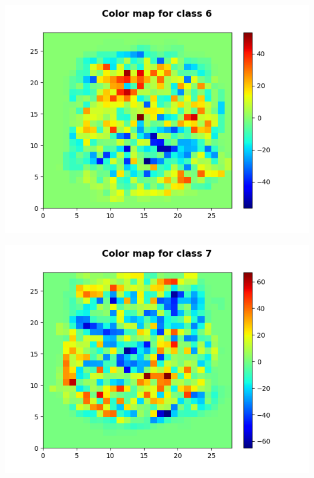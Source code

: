 \documentclass[11pt]{article}
\begin{document}
\begin{center}
\includegraphics[scale=0.80]{part1.ec2/digit6.png}
\end{center}

\begin{center}
\includegraphics[scale=0.80]{part1.ec2/digit7.png}
\end{center}
\end{document}
